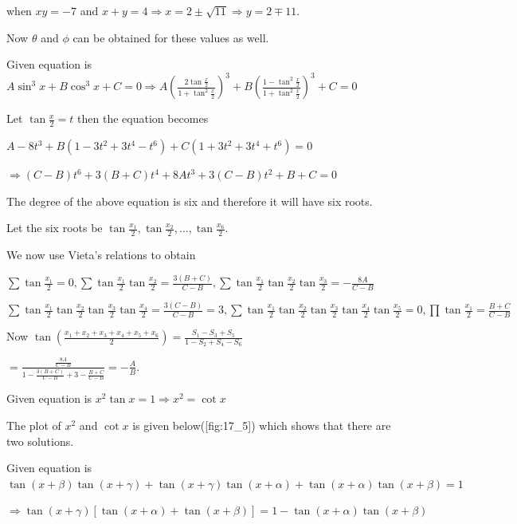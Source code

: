   when $xy = -7$ and $x + y = 4\Rightarrow x = 2\pm\sqrt{11}\Rightarrow y = 2\mp 11$.

  Now $\theta$ and $\phi$ can be obtained for these values as well.
\item Given equation is $A\sin^3x + B\cos^3x + C = 0\Rightarrow A\left(\frac{2\tan\frac{x}{2}}{1
  + \tan^2\frac{x}{2}}\right)^3 + B\left(\frac{1 - \tan^2\frac{x}{2}}{1 + \tan^2\frac{x}{2}}\right)^3 + C =
  0$

  Let $\tan\frac{x}{2} = t$ then the equation becomes

  $A - 8t^3 + B\left(1 - 3t^2 + 3t^4 - t^6\right) + C\left(1 + 3t^2 + 3t^4 + t^6\right) = 0$

  $\Rightarrow (C - B)t^6 + 3(B + C)t^4 + 8At^3 + 3(C - B)t^2 + B + C = 0$

  The degree of the above equation is six and therefore it will have six roots.

  Let the six roots be $\tan\frac{x_1}{2}, \tan\frac{x_2}{2}, \ldots, \tan\frac{x_6}{2}$.

  We now use Vieta's relations to obtain

  $\displaystyle\sum \tan\frac{x_1}{2} = 0, \sum \tan\frac{x_1}{2}\tan\frac{x_2}{2} = \frac{3(B + C)}{C -
    B}, \sum \tan\frac{x_1}{2}\tan\frac{x_2}{2}\tan\frac{x_3}{2} = -\frac{8A}{C - B}$

  $\displaystyle\sum \tan\frac{x_1}{2}\tan\frac{x_2}{2}\tan\frac{x_3}{2}\tan\frac{x_4}{2} = \frac{3(C -
    B)}{C - B} =
  3, \sum \tan\frac{x_1}{2}\tan\frac{x_2}{2}\tan\frac{x_3}{2}\tan\frac{x_4}{2}\tan\frac{x_5}{2} =
  0, \prod\tan\frac{x_1}{2} = \frac{B + C}{C - B}$

  Now $\tan\left(\frac{x_1 + x_2 + x_3 + x_4 + x_5 + x_6}{2}\right) = \frac{S_1 - S_3 + S_5}{1 - S_2 + S_4 -
    S_6}$

  $= \frac{\frac{8A}{C - B}}{1 - \frac{3(B + C)}{C - B} + 3 - \frac{B + C}{C - B}} = -\frac{A}{B}$.
\item Given equation is $x^2\tan x = 1 \Rightarrow x^2 = \cot x$

  The plot of $x^2$ and $\cot x$ is given below([fig:17_5]) which shows that there are two solutions.

\item Given equation is $\tan(x + \beta)\tan(x + \gamma) + \tan(x + \gamma)\tan(x + \alpha) + \tan(x
  + \alpha)\tan(x + \beta) = 1$

  $\Rightarrow \tan(x + \gamma)[\tan(x + \alpha) + \tan(x + \beta)] = 1 - \tan(x + \alpha)\tan(x + \beta)$

